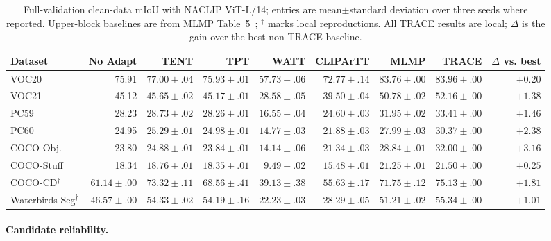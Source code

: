 \documentclass[letterpaper]{article}
\newcommand{\method}{TRACE\xspace}
\begin{document}
	\begin{table}[!t]
		\centering
		\small
		\setlength{\tabcolsep}{2.35pt}
		\begin{tabular*}{\textwidth}{@{\extracolsep{\fill}}lrrrrrrrr}
			\toprule
			Dataset & No Adapt & TENT & TPT & WATT & CLIPArTT & MLMP & \method{} & $\Delta$ vs. best \\
			\midrule
			VOC20 & 75.91 & $77.00{\pm}.04$ & $75.93{\pm}.01$ & $57.73{\pm}.06$ & $72.77{\pm}.14$ & $83.76{\pm}.00$ & $\mathbf{83.96{\pm}.00}$ & $\mathbf{+0.20}$ \\
			VOC21 & 45.12 & $45.65{\pm}.02$ & $45.17{\pm}.01$ & $28.58{\pm}.05$ & $39.50{\pm}.04$ & $50.78{\pm}.02$ & $\mathbf{52.16{\pm}.00}$ & $\mathbf{+1.38}$ \\
			PC59 & 28.23 & $28.73{\pm}.02$ & $28.26{\pm}.01$ & $16.55{\pm}.04$ & $24.60{\pm}.03$ & $31.95{\pm}.02$ & $\mathbf{33.41{\pm}.00}$ & $\mathbf{+1.46}$ \\
			PC60 & 24.95 & $25.29{\pm}.01$ & $24.98{\pm}.01$ & $14.77{\pm}.03$ & $21.88{\pm}.03$ & $27.99{\pm}.03$ & $\mathbf{30.37{\pm}.00}$ & $\mathbf{+2.38}$ \\
			COCO Obj. & 23.80 & $24.88{\pm}.01$ & $23.84{\pm}.01$ & $14.14{\pm}.06$ & $21.34{\pm}.03$ & $28.84{\pm}.01$ & $\mathbf{32.00{\pm}.00}$ & $\mathbf{+3.16}$ \\
			COCO-Stuff & 18.34 & $18.76{\pm}.01$ & $18.35{\pm}.01$ & $9.49{\pm}.02$ & $15.48{\pm}.01$ & $21.25{\pm}.01$ & $\mathbf{21.50{\pm}.00}$ & $\mathbf{+0.25}$ \\
			\midrule
			COCO-CD$^\dagger$ & $61.14{\pm}.00$ & $73.32{\pm}.11$ & $68.56{\pm}.41$ & $39.13{\pm}.38$ & $55.63{\pm}.17$ & $71.75{\pm}.12$ & $\mathbf{75.13{\pm}.00}$ & $\mathbf{+1.81}$ \\
			Waterbirds-Seg$^\dagger$ & $46.57{\pm}.00$ & $54.33{\pm}.02$ & $54.19{\pm}.16$ & $22.23{\pm}.03$ & $28.29{\pm}.05$ & $51.21{\pm}.02$ & $\mathbf{55.34{\pm}.00}$ & $\mathbf{+1.01}$ \\
			\bottomrule
		\end{tabular*}
		\caption{Full-validation clean-data mIoU with NACLIP ViT-L/14; entries are mean$\pm$standard deviation over three seeds where reported. Upper-block baselines are from MLMP Table~5~\cite{noori2025mlmp}; $^\dagger$ marks local reproductions. All \method results are local; $\Delta$ is the gain over the best non-\method baseline.}
		\label{tab:main-results}
	\end{table}
	
	\paragraph{Candidate reliability.}
	
\end{document}

